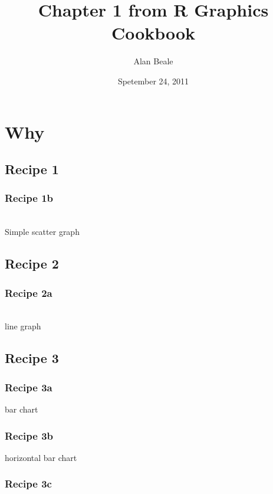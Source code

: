 \documentclass[10pt]{article}
\title{Chapter 1 from R Graphics Cookbook }
\author{Alan Beale}
\date{Spetember 24, 2011}
\begin{document}
\sffamily 
\maketitle

\section{Why}

\subsection{Recipe 1}

\subsubsection{Recipe 1b}
\\
 Simple scatter graph
\subsection{Recipe 2}

\subsubsection{Recipe 2a}
 \\
 line graph
\subsection{Recipe 3}

\subsubsection{Recipe 3a}

 bar chart
\subsubsection{Recipe 3b}

horizontal bar chart
\subsubsection{Recipe 3c}



\end{document}
